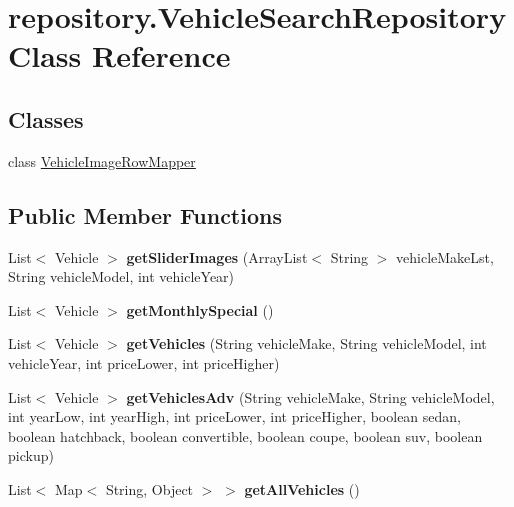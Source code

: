 \hypertarget{classrepository_1_1_vehicle_search_repository}{}\section{repository.\+Vehicle\+Search\+Repository Class Reference}
\label{classrepository_1_1_vehicle_search_repository}
\subsection*{Classes}
\begin{DoxyCompactItemize}
\item 
class \mbox{\hyperlink{classrepository_1_1_vehicle_search_repository_1_1_vehicle_image_row_mapper}{Vehicle\+Image\+Row\+Mapper}}
\end{DoxyCompactItemize}
\subsection*{Public Member Functions}
\begin{DoxyCompactItemize}
\item 
\mbox{\label{classrepository_1_1_vehicle_search_repository_a0684c665d880be1396f31c2228f9e06d}} 
List$<$ Vehicle $>$ {\bfseries get\+Slider\+Images} (Array\+List$<$ String $>$ vehicle\+Make\+Lst, String vehicle\+Model, int vehicle\+Year)
\item 
\mbox{\label{classrepository_1_1_vehicle_search_repository_a1e16fae6c7bcbfaf86e9b926146b946d}} 
List$<$ Vehicle $>$ {\bfseries get\+Monthly\+Special} ()
\item 
\mbox{\label{classrepository_1_1_vehicle_search_repository_a662db6d5c7913d2c2df1a86bccbf42ed}} 
List$<$ Vehicle $>$ {\bfseries get\+Vehicles} (String vehicle\+Make, String vehicle\+Model, int vehicle\+Year, int price\+Lower, int price\+Higher)
\item 
\mbox{\label{classrepository_1_1_vehicle_search_repository_afc1e2fe4d49dbe5da70208d1d92576c6}} 
List$<$ Vehicle $>$ {\bfseries get\+Vehicles\+Adv} (String vehicle\+Make, String vehicle\+Model, int year\+Low, int year\+High, int price\+Lower, int price\+Higher, boolean sedan, boolean hatchback, boolean convertible, boolean coupe, boolean suv, boolean pickup)
\item 
\mbox{\label{classrepository_1_1_vehicle_search_repository_addcc9a202849d51f18dca62bc7b536fc}} 
List$<$ Map$<$ String, Object $>$ $>$ {\bfseries get\+All\+Vehicles} ()
\end{DoxyCompactItemize}
